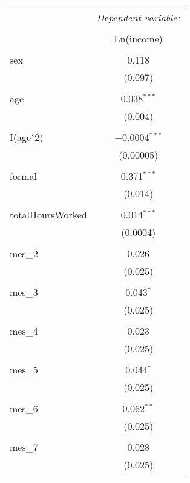 
\begin{table}[!htbp] \centering 
  \caption{} 
  \label{} 
\begin{tabular}{@{\extracolsep{5pt}}lc} 
\\[-1.8ex]\hline 
\hline \\[-1.8ex] 
 & \multicolumn{1}{c}{\textit{Dependent variable:}} \\ 
\cline{2-2} 
\\[-1.8ex] & Ln(income) \\ 
\hline \\[-1.8ex] 
 sex & 0.118 \\ 
  & (0.097) \\ 
  & \\ 
 age & 0.038$^{***}$ \\ 
  & (0.004) \\ 
  & \\ 
 I(age$\hat{\mkern6mu}$2) & $-$0.0004$^{***}$ \\ 
  & (0.00005) \\ 
  & \\ 
 formal & 0.371$^{***}$ \\ 
  & (0.014) \\ 
  & \\ 
 totalHoursWorked & 0.014$^{***}$ \\ 
  & (0.0004) \\ 
  & \\ 
 mes\_2 & 0.026 \\ 
  & (0.025) \\ 
  & \\ 
 mes\_3 & 0.043$^{*}$ \\ 
  & (0.025) \\ 
  & \\ 
 mes\_4 & 0.023 \\ 
  & (0.025) \\ 
  & \\ 
 mes\_5 & 0.044$^{*}$ \\ 
  & (0.025) \\ 
  & \\ 
 mes\_6 & 0.062$^{**}$ \\ 
  & (0.025) \\ 
  & \\ 
 mes\_7 & 0.028 \\ 
  & (0.025) \\ 
  & \\ 

\end{tabular}
\end{table}

